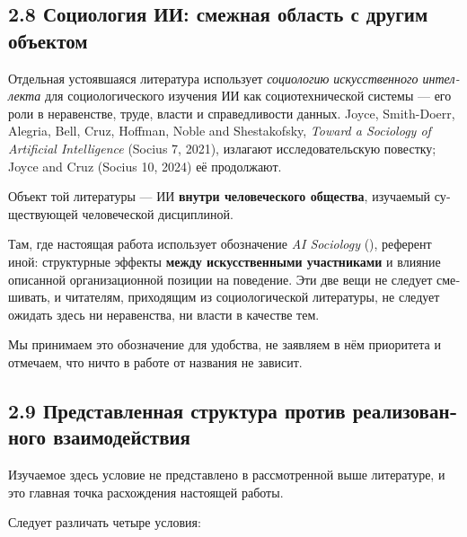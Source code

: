 \begin{russian}
\subsection*{2.8 Социология ИИ: смежная область с другим объектом}
\label{sec:ru:2.8}

\gcheck{} Отдельная устоявшаяся литература использует \emph{социологию искусственного интеллекта} для социологического изучения ИИ как социотехнической системы — его роли в неравенстве, труде, власти и справедливости данных. Joyce, Smith-Doerr, Alegria, Bell, Cruz, Hoffman, Noble and Shestakofsky, \emph{Toward a Sociology of Artificial Intelligence} (Socius 7, 2021), излагают исследовательскую повестку; Joyce and Cruz (Socius 10, 2024) её продолжают.

Объект той литературы — ИИ \textbf{внутри человеческого общества}, изучаемый существующей человеческой дисциплиной.

Там, где настоящая работа использует обозначение \emph{AI Sociology} (), референт иной: структурные эффекты \textbf{между искусственными участниками} и влияние описанной организационной позиции на поведение. Эти две вещи не следует смешивать, и читателям, приходящим из социологической литературы, не следует ожидать здесь ни неравенства, ни власти в качестве тем.

Мы принимаем это обозначение для удобства, не заявляем в нём приоритета и отмечаем, что ничто в работе от названия не зависит.


\subsection*{2.9 Представленная структура против реализованного взаимодействия}
\label{sec:ru:2.9}

Изучаемое здесь условие не представлено в рассмотренной выше литературе, и это главная точка расхождения настоящей работы.

Следует различать четыре условия:


\end{russian}
